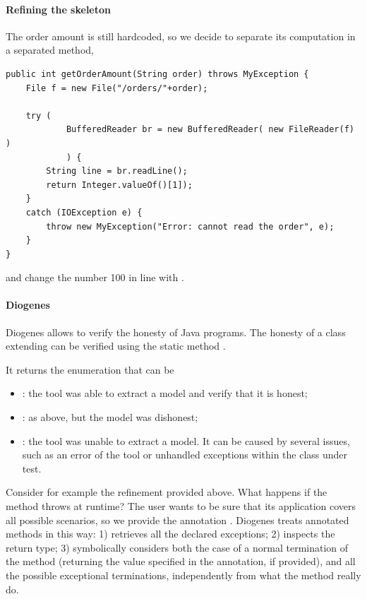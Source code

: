 \paragraph{Refining the skeleton}
The order amount is still hardcoded, so we decide to separate its computation
in a separated method, \eg
\begin{mdframed}
\begin{verbatim}
public int getOrderAmount(String order) throws MyException {
    File f = new File("/orders/"+order);
    
    try (
            BufferedReader br = new BufferedReader( new FileReader(f) )
            ) {
        String line = br.readLine();
        return Integer.valueOf()[1]);        
    }
    catch (IOException e) {
        throw new MyException("Error: cannot read the order", e);
    }    
}
\end{verbatim}
\end{mdframed}
and change the number 100 in line  with .

\paragraph{Diogenes}
Diogenes allows to verify the honesty of Java programs.
The honesty of a class extending  
can be verified using the static method 
.

It returns the enumeration  that can be
\begin{itemize}
\item {}: the tool was able to extract a \coco model and verify that it is honest;
\item {}: as above, but the model was dishonest;
\item {}: the tool was unable to extract a model. 
It can be caused by several issues, such as an error of the 
tool or unhandled exceptions within the class under test.
\end{itemize}

Consider for example the refinement provided above.
What happens if the method throws  at runtime?
The user wants to be sure that its application covers all possible scenarios,
so we provide the annotation .
Diogenes treats annotated methods in this way:
1) retrieves all the declared exceptions;
2) inspects the return type;
3) symbolically considers both the case of a normal termination of the method
(returning the value specified in the annotation, if provided),
and all the possible exceptional terminations, 
independently from what the method really do.

